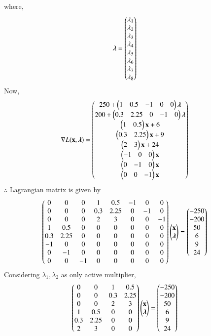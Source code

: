 \documentclass[journal,12pt,twocolumn]{IEEEtran}
\begin{document}
where,
\begin{align}
    \boldsymbol{\lambda} &= \begin{pmatrix}\lambda_1 \\ \lambda_2 \\ \lambda_3 \\ \lambda_4 \\ \lambda_5 \\ \lambda_6\\\lambda_7 \\ \lambda_8 \end{pmatrix}
\end{align}
Now,
\begin{align}
    \nabla L(\mathbf{x},\boldsymbol{\lambda}) &= \begin{pmatrix}250+ \begin{pmatrix}1 & 0.5 & -1 & 0 & 0 \end{pmatrix}\boldsymbol{\lambda}\\ 200+\begin{pmatrix}0.3 & 2.25 & 0 & -1 & 0\end{pmatrix}\boldsymbol{\lambda} \\ \begin{pmatrix}1 & 0.5\end{pmatrix}\mathbf{x}+6 \\ \begin{pmatrix}0.3 & 2.25\end{pmatrix}\mathbf{x}+9 \\ \begin{pmatrix}2 & 3\end{pmatrix}\mathbf{x}+24 \\ \begin{pmatrix}-1 & 0 & 0\end{pmatrix}\mathbf{x} \\ \begin{pmatrix}0 & -1 & 0\end{pmatrix}\mathbf{x}\\ \begin{pmatrix}0 & 0 & -1\end{pmatrix}\mathbf{x}\end{pmatrix}
\end{align}
$\therefore$ Lagrangian matrix is given by
\begin{align}
    \begin{pmatrix}0 & 0 & 0 & 1 & 0.5 & -1 & 0 & 0 \\ 0 & 0 & 0 & 0.3 & 2.25 & 0 & -1 & 0 \\ 0 & 0 & 0 & 2 & 3 & 0 & 0 & -1\\ 1 & 0.5 & 0 & 0 & 0 & 0 & 0 & 0  \\ 0.3 & 2.25 & 0 & 0 & 0 & 0 & 0 & 0  \\ -1 & 0 & 0 & 0 & 0 & 0 & 0 & 0  \\ 0 & -1 & 0 & 0 & 0 & 0 & 0 & 0 \\ 0 & 0 & -1 & 0 & 0 & 0 & 0 & 0  \end{pmatrix}\begin{pmatrix}\mathbf{x} \\ \boldsymbol{\lambda} \end{pmatrix} &= \begin{pmatrix}-250 \\ -200 \\ 50\\ 6 \\ 9 \\ 24 \end{pmatrix}
\end{align}
Considering $\lambda_1,\lambda_2$ as only active multiplier,
\begin{align}
    \begin{pmatrix}0 & 0 & 1 & 0.5 \\ 0 & 0 & 0.3 & 2.25 \\ 0 & 0 & 2 & 3  \\ 1 & 0.5 & 0 & 0 \\ 0.3 & 2.25 & 0 & 0 \\ 2 & 3 & 0 & 0 \end{pmatrix}\begin{pmatrix}\mathbf{x}\\ \boldsymbol{\lambda}\end{pmatrix} &=\begin{pmatrix}-250 \\ -200 \\ 50\\ 6 \\ 9 \\ 24 \end{pmatrix}
\end{align}
\end{document}
